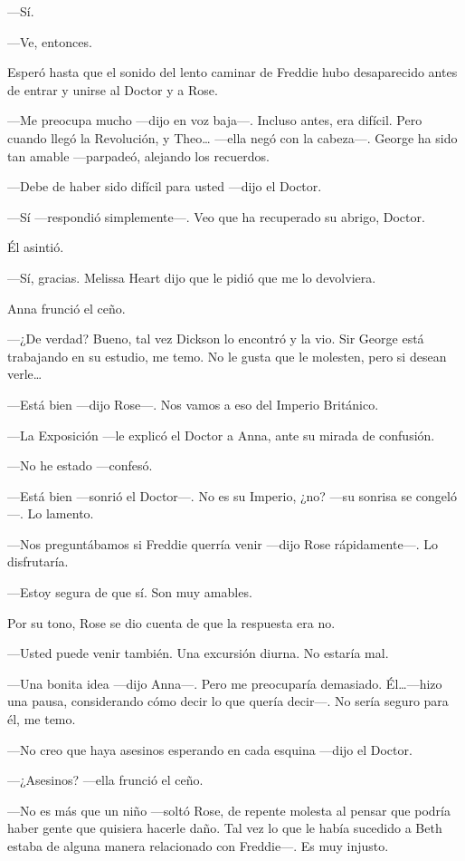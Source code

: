 {---Sí.}

{---Ve, entonces.}

{Esperó hasta que el sonido del lento caminar de Freddie hubo
desaparecido antes de entrar y unirse al Doctor y a Rose.}

{---Me preocupa mucho ---dijo en voz baja---. Incluso antes, era
	difícil. Pero cuando llegó la Revolución, y Theo\ldots{} ---ella negó
	con la cabeza---. George ha sido tan amable ---parpadeó, alejando los
recuerdos.}

{---Debe de haber sido difícil para usted ---dijo el Doctor.}

{---Sí ---respondió simplemente---. Veo que ha recuperado su abrigo,
Doctor.}

{Él asintió.}

{---Sí, gracias. Melissa Heart dijo que le pidió que me lo devolviera.}

{Anna frunció el ceño.}

{---¿De verdad? Bueno, tal vez Dickson lo encontró y la vio. Sir George
	está trabajando en su estudio, me temo. No le gusta que le molesten,
	pero si desean verle\ldots{}}

{---Está bien ---dijo Rose---. Nos vamos a eso del Imperio Británico.}

{---La Exposición ---le explicó el Doctor a Anna, ante su mirada de
confusión.}

{---No he estado ---confesó.}

{---Está bien ---sonrió el Doctor---. No es su Imperio, ¿no? ---su
sonrisa se congeló---. Lo lamento.}

{---Nos preguntábamos si Freddie querría venir ---dijo Rose
rápidamente---. Lo disfrutaría.}

{---Estoy segura de que sí. Son muy amables.}

{Por su tono, Rose se dio cuenta de que la respuesta era no.}

{---Usted puede venir también. Una excursión diurna. No estaría mal.}

{---Una bonita idea ---dijo Anna---. Pero me preocuparía demasiado.
	Él\ldots{}---hizo una pausa, considerando cómo decir lo que quería
decir---. No sería seguro para él, me temo.}

{---No creo que haya asesinos esperando en cada esquina ---dijo el
Doctor.}

{---¿Asesinos? ---ella frunció el ceño.}

{---No es más que un niño ---soltó Rose, de repente molesta al pensar
	que podría haber gente que quisiera hacerle daño. Tal vez lo que le
	había sucedido a Beth estaba de alguna manera relacionado con
Freddie---. Es muy injusto.}

